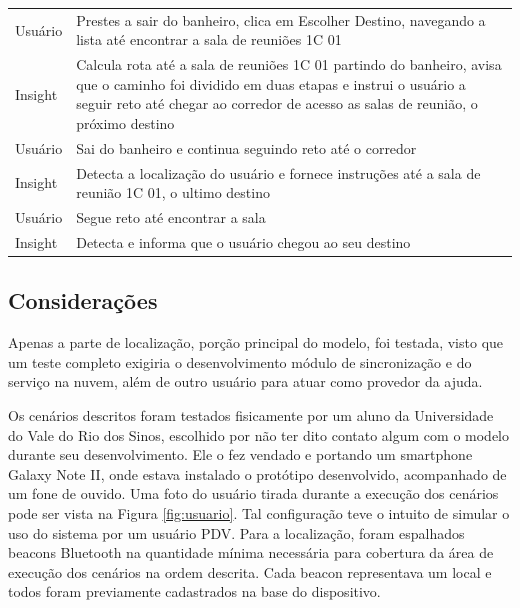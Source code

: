 \documentclass[twoside,english,brazilian]{UNISINOSartigo}
\begin{document}
\begin{table}
\begin{minipage}{0.9\textwidth}
\begin{adjustbox}{max width=\textwidth}
\begin{tabular}{ p{} | p{14cm} }
Usuário & Prestes a sair do banheiro, clica em Escolher Destino, navegando a lista até encontrar a sala de reuniões 1C 01 \\
Insight & Calcula rota até a sala de reuniões 1C 01 partindo do banheiro, avisa que o caminho foi dividido em duas etapas e instrui o usuário a seguir reto até chegar ao corredor de acesso as salas de reunião, o próximo destino \\
Usuário & Sai do banheiro e continua seguindo reto até o corredor \\
Insight & Detecta a localização do usuário e fornece instruções até a sala de reunião 1C 01, o ultimo destino \\
Usuário & Segue reto até encontrar a sala \\
Insight & Detecta e informa que o usuário chegou ao seu destino \\
\hline
			\end{tabular}
		\end{adjustbox}
	\end{minipage}
\end{table}

\subsection{Considerações}\label{sec:consideracoes}
Apenas a parte de localização, porção principal do modelo, foi testada, visto que um teste completo exigiria o desenvolvimento módulo de sincronização e do serviço na nuvem, além de outro usuário para atuar como provedor da ajuda.

Os cenários descritos foram testados fisicamente por um aluno da Universidade do Vale do Rio dos Sinos, escolhido por não ter dito contato algum com o modelo durante seu desenvolvimento. Ele o fez vendado e portando um smartphone Galaxy Note II, onde estava instalado o protótipo desenvolvido, acompanhado de um fone de ouvido. Uma foto do usuário tirada durante a execução dos cenários pode ser vista na Figura \ref{fig:usuario}. Tal configuração teve o intuito de simular o uso do sistema por um usuário PDV. Para a localização, foram espalhados beacons Bluetooth na quantidade mínima necessária para cobertura da área de execução dos cenários na ordem descrita. Cada beacon representava um local e todos foram previamente cadastrados na base do dispositivo. 
\end{document}
